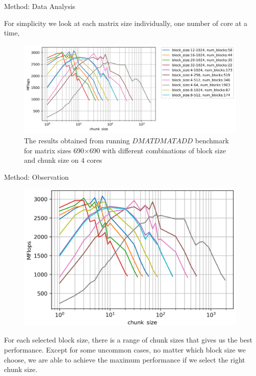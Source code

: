 \documentclass[10pt]{beamer}
\begin{document}
\begin{frame}{Method: Data Analysis}
	\begin{outline}
		\1For simplicity we look at each matrix size individually, one number of core at a time, 
		
		
		\begin{figure}
			\includegraphics[width=0.9\linewidth]{images/fig5.png}	
			\caption{The results obtained from running $DMATDMATADD$ benchmark for matrix sizes 690$\times$690 with different combinations of block size and chunk size on $4$ cores}	
		\end{figure}
	\end{outline}
\end{frame}


\begin{frame}{Method: Observation}
	\begin{outline}
		\begin{figure}
			\includegraphics[scale=0.2]{images/fig5_cropped.png}			
		\end{figure}
		\1For each selected block size, there is a range of chunk sizes that gives us the best performance. 
		\1Except for some uncommon cases, no matter which block size we choose, we are able to achieve the maximum performance if we select the right chunk size.  
	\end{outline}
\end{frame}
\end{document}

